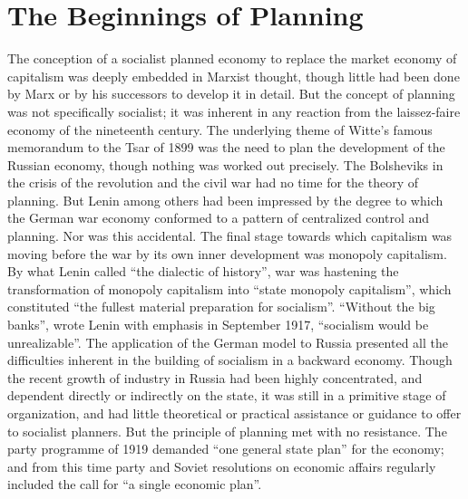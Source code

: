 \chapter{The Beginnings of Planning}

The conception of a socialist planned economy to replace the market economy of capitalism was deeply embedded in Marxist thought, though little had been done by Marx or by his successors to develop it in detail. But the concept of planning was not specifically socialist; it was inherent in any reaction from the laissez-faire economy of the nineteenth century. The underlying theme of Witte's famous memorandum to the Tsar of 1899 was the need to plan the development of the Russian economy, though nothing was worked out precisely. The Bolsheviks in the crisis of the revolution and the civil war had no time for the theory of planning. But Lenin among others had been impressed by the degree to which the German war economy conformed to a pattern of centralized control and planning. Nor was this accidental. The final stage towards which capitalism was moving before the war by its own inner development was monopoly capitalism. By what Lenin called ``the dialectic of history'', war was hastening the transformation of monopoly capitalism into ``state monopoly capitalism'', which constituted ``the fullest material preparation for socialism''. ``Without the big banks'', wrote Lenin with emphasis in September 1917, ``socialism would be unrealizable''. The application of the German model to Russia presented all the difficulties inherent in the building of socialism in a backward economy. Though the recent growth of industry in Russia had been highly concentrated, and dependent directly or indirectly on the state, it was still in a primitive stage of organization, and had little theoretical or practical assistance or guidance to offer to socialist planners. But the principle of planning met with no resistance. The party programme of 1919 demanded ``one general state plan'' for the economy; and from this time party and Soviet resolutions on economic affairs regularly included the call for ``a single economic plan''. 

